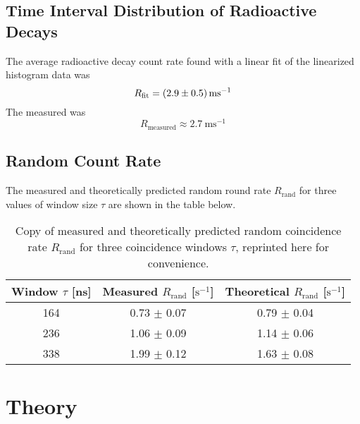 \documentclass[11pt, a4paper]{article}
\begin{document}
\subsection{Time Interval Distribution of Radioactive Decays}
The average radioactive decay count rate found with a linear fit of the linearized histogram data was
\begin{equation*}
	R_{\text{fit}} = \SI{2.9 \pm 0.5}{\milli \second^{-1}}
\end{equation*}
The measured  was
\begin{equation*}
	R_{\text{measured}} \approx \SI{2.7}{\milli \second^{-1}}
\end{equation*}

\subsection{Random Count Rate}
The measured and theoretically predicted random round rate $ R_{\text{rand}} $ for three values of window size $ \tau $ are shown in the table below.
\begin{table}[htb!]
\centering
\begin{tabular}{c|c|c}
	Window $ \tau $ [\si{\nano \second}]& Measured $ R_{\text{rand}} $ [$ \si{\second}^{-1} $] & Theoretical $ R_{\text{rand}} $ [$ \si{\second}^{-1} $]\\
	\hline 
	164 & 0.73 $ \pm $ 0.07 & 0.79 $ \pm $ 0.04\\
	236 & 1.06 $ \pm $ 0.09 & 1.14 $ \pm $ 0.06\\
	338 & 1.99 $ \pm $ 0.12 & 1.63 $ \pm $ 0.08
\end{tabular}
\caption{Copy of measured and theoretically predicted random coincidence rate $ R_{\text{rand}} $ for three coincidence windows $ \tau $, reprinted here for convenience.}
\end{table}



\appendix 
\section{Theory}
\end{document}
